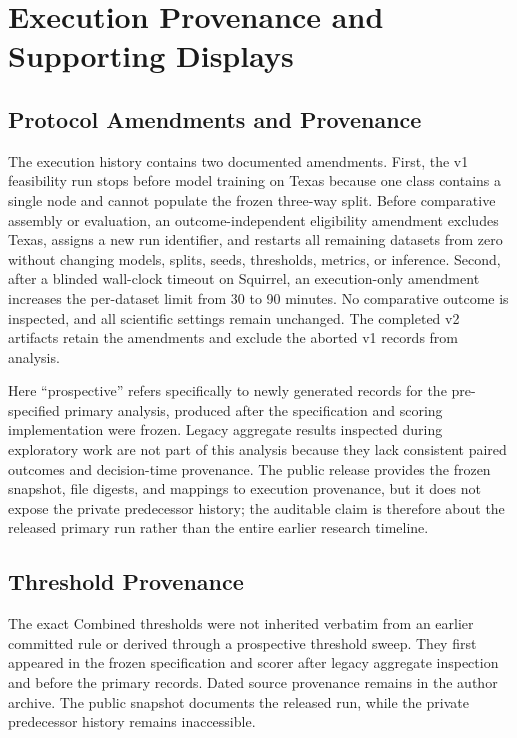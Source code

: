 \section{Execution Provenance and Supporting Displays}
\label{app:execution_details}

\subsection{Protocol Amendments and Provenance}

The execution history contains two documented amendments. First, the v1 feasibility run stops before model training on Texas because one class contains a single node and cannot populate the frozen three-way split. Before comparative assembly or evaluation, an outcome-independent eligibility amendment excludes Texas, assigns a new run identifier, and restarts all remaining datasets from zero without changing models, splits, seeds, thresholds, metrics, or inference. Second, after a blinded wall-clock timeout on Squirrel, an execution-only amendment increases the per-dataset limit from 30 to 90 minutes. No comparative outcome is inspected, and all scientific settings remain unchanged. The completed v2 artifacts retain the amendments and exclude the aborted v1 records from analysis.

Here ``prospective'' refers specifically to newly generated records for the pre-specified primary analysis, produced after the specification and scoring implementation were frozen. Legacy aggregate results inspected during exploratory work are not part of this analysis because they lack consistent paired outcomes and decision-time provenance. The public release provides the frozen snapshot, file digests, and mappings to execution provenance, but it does not expose the private predecessor history; the auditable claim is therefore about the released primary run rather than the entire earlier research timeline.

\subsection{Threshold Provenance}

The exact Combined thresholds were not inherited verbatim from an earlier committed rule or derived through a prospective threshold sweep. They first appeared in the frozen specification and scorer after legacy aggregate inspection and before the primary records. Dated source provenance remains in the author archive. The public snapshot documents the released run, while the private predecessor history remains inaccessible.

